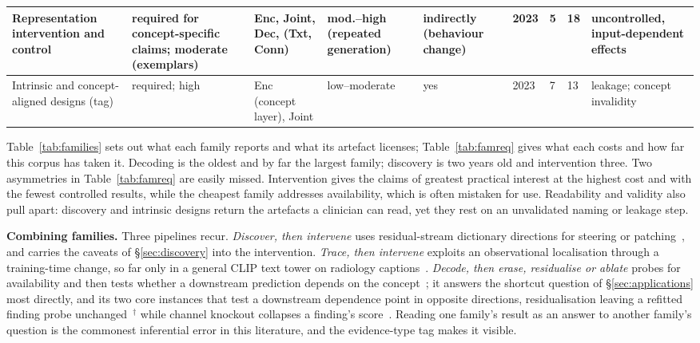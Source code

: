 \begin{table}[!tb]
\begin{tabular}{@{}L{2.2cm}L{2.1cm}L{2.0cm}L{1.6cm}L{1.8cm}C{0.7cm}C{0.8cm}C{0.8cm}L{2.8cm}@{}}
Representation intervention and control & required for concept-\hspace{0pt}specific claims; moderate (exemplars) & Enc, Joint, Dec, (Txt, Conn) & mod.--high (repeated generation) & indirectly (behaviour change) & 2023 & 5 & 18 & uncontrolled, input-\hspace{0pt}dependent effects \\
\midrule
Intrinsic and concept-aligned designs (tag) & required; high & Enc (concept layer), Joint & low--moderate & yes & 2023 & 7 & 13 & leakage; concept invalidity \\
\bottomrule
\end{tabular}
\end{table}

Table~\ref{tab:families} sets out what each family reports and what its artefact licenses;
Table~\ref{tab:famreq} gives what each costs and how far this corpus has taken it. Decoding is the
oldest and by far the largest family; discovery is two years old and intervention three. Two asymmetries
in Table~\ref{tab:famreq} are easily missed. Intervention gives the claims of greatest practical interest
at the highest cost and with the fewest controlled results, while the cheapest family addresses
availability, which is often mistaken for use. Readability and validity also pull apart: discovery and
intrinsic designs return the artefacts a clinician can read, yet they rest on an unvalidated naming or
leakage step.

\textbf{Combining families.} Three pipelines recur. \emph{Discover, then intervene} uses residual-stream
dictionary directions for steering or
patching~\cite{bouzid2025insights,nooralahzadeh2026universal,sadanandan2026mechanistically}, and carries
the caveats of \S\ref{sec:discovery} into the intervention. \emph{Trace, then intervene} exploits an
observational localisation through a training-time change, so far only in a general CLIP text tower on
radiology captions~\cite{abbasi2026layerspecific}. \emph{Decode, then erase, residualise or ablate}
probes for availability and then tests whether a downstream prediction depends on the
concept~\cite{kim2026encoding,nooralahzadeh2026sparse,weber2023posthoc}; it answers the shortcut
question of \S\ref{sec:applications} most directly, and its two core instances that test a downstream
dependence point in opposite directions, residualisation leaving a refitted finding probe
unchanged~\cite{kim2026encoding}$^{\dagger}$ while channel knockout collapses a finding's
score~\cite{nooralahzadeh2026sparse}. Reading one family's result as an answer to another family's
question is the commonest inferential error in this literature, and the evidence-type tag makes it
visible.

